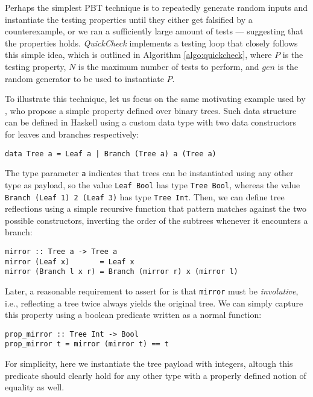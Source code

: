 \documentclass[acmsmall, anonymous]{acmart}
\newcommand{\quickcheck}{\textit{QuickCheck}\xspace}
\begin{document}
Perhaps the simplest PBT technique is to repeatedly generate random inputs and
instantiate the testing properties until they either get falsified by a
counterexample, or we ran a sufficiently large amount of tests --- suggesting
that the properties holds.
%
\quickcheck implements a testing loop that closely follows this simple idea,
which is outlined in Algorithm \ref{algo:quickcheck}, where $P$ is the testing
property, $N$ is the maximum number of tests to perform, and $gen$ is the random
generator to be used to instantiate $P$.


To illustrate this technique, let us focus on the same motivating example used
by \citeauthor{lampropoulos2019coverage}, who propose a simple property defined over
binary trees.
%
Such data structure can be defined in Haskell using a custom data type with two
data constructors for leaves and branches respectively:

\begin{verbatim}
data Tree a = Leaf a | Branch (Tree a) a (Tree a)
\end{verbatim}

\noindent The type parameter \texttt{a} indicates that trees can be instantiated
using any other type as payload, so the value \texttt{Leaf Bool} has type
\texttt{Tree Bool}, whereas the value \texttt{Branch (Leaf 1) 2 (Leaf 3)} has
type \texttt{Tree Int}.
%
Then, we can define tree reflections using a simple recursive function that
pattern matches against the two possible constructors, inverting the order of
the subtrees whenever it encounters a branch:

\begin{verbatim}
mirror :: Tree a -> Tree a
mirror (Leaf x)       = Leaf x
mirror (Branch l x r) = Branch (mirror r) x (mirror l)
\end{verbatim}

Later, a reasonable requirement to assert for is that \texttt{mirror} must be
\emph{involutive}, i.e., reflecting a tree twice always yields the original
tree.
%
We can simply capture this property using a boolean predicate written as a
normal function:

\begin{verbatim}
prop_mirror :: Tree Int -> Bool
prop_mirror t = mirror (mirror t) == t
\end{verbatim}

\noindent For simplicity, here we instantiate the tree payload with integers,
altough this predicate should clearly hold for any other type with a properly
defined notion of equality as well.
\end{document}
